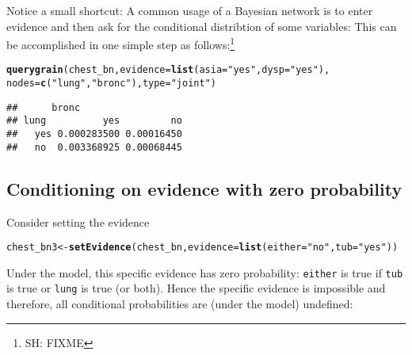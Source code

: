 \documentclass[10pt]{article}\usepackage[]{graphicx}\usepackage[]{color}
\makeatletter
\newcommand{\hlstr}[1]{\textcolor[rgb]{0.192,0.494,0.8}{#1}}%
\newcommand{\hlstd}[1]{\textcolor[rgb]{0.345,0.345,0.345}{#1}}%
\newcommand{\hlkwb}[1]{\textcolor[rgb]{0.69,0.353,0.396}{#1}}%
\newcommand{\hlkwc}[1]{\textcolor[rgb]{0.333,0.667,0.333}{#1}}%
\newcommand{\hlkwd}[1]{\textcolor[rgb]{0.737,0.353,0.396}{\textbf{#1}}}%
\newenvironment{kframe}{%
 \def\at@end@of@kframe{}%
 \ifinner\ifhmode%
  \def\at@end@of@kframe{\end{minipage}}%
  \begin{minipage}{\columnwidth}%
 \fi\fi%
 \def\FrameCommand##1{\hskip\@totalleftmargin \hskip-\fboxsep
 \colorbox{shadecolor}{##1}\hskip-\fboxsep
     \hskip-\linewidth \hskip-\@totalleftmargin \hskip\columnwidth}%
 \MakeFramed {\advance\hsize-\width
   \@totalleftmargin\z@ \linewidth\hsize
   \@setminipage}}%
 {\par\unskip\endMakeFramed%
 \at@end@of@kframe}
\newenvironment{knitrout}{}{} %
\makeatother
\begin{document}
Notice a small shortcut: A common usage of a Bayesian network is to
enter evidence and then ask for the conditional distribtion of some
variables: This can be accomplished in one simple step as follows:\footnote{SH: FIXME}
\begin{knitrout}
\color{fgcolor}\begin{kframe}
\begin{alltt}
\hlkwd{querygrain}\hlstd{(chest_bn,} \hlkwc{evidence}\hlstd{=}\hlkwd{list}\hlstd{(}\hlkwc{asia}\hlstd{=}\hlstr{"yes"}\hlstd{,} \hlkwc{dysp}\hlstd{=}\hlstr{"yes"}\hlstd{),}
           \hlkwc{nodes}\hlstd{=}\hlkwd{c}\hlstd{(}\hlstr{"lung"}\hlstd{,} \hlstr{"bronc"}\hlstd{),} \hlkwc{type}\hlstd{=}\hlstr{"joint"}\hlstd{)}
\end{alltt}
\begin{verbatim}
##      bronc
## lung          yes         no
##   yes 0.000283500 0.00016450
##   no  0.003368925 0.00068445
\end{verbatim}
\end{kframe}
\end{knitrout}



\subsection{Conditioning on evidence with zero probability}
\label{sec:zero-probabilities}

Consider setting the evidence
\begin{knitrout}
\color{fgcolor}\begin{kframe}
\begin{alltt}
\hlstd{chest_bn3} \hlkwb{<-} \hlkwd{setEvidence}\hlstd{(chest_bn,} \hlkwc{evidence}\hlstd{=}\hlkwd{list}\hlstd{(}\hlkwc{either}\hlstd{=}\hlstr{"no"}\hlstd{,} \hlkwc{tub}\hlstd{=}\hlstr{"yes"}\hlstd{))}
\end{alltt}
\end{kframe}
\end{knitrout}

Under the model, this specific evidence has zero probability:
\verb|either| is true if \verb|tub| is true or \verb|lung| is true (or
both). Hence the specific evidence is impossible and therefore, all
conditional probabilities are (under the model) undefined:
\end{document}
